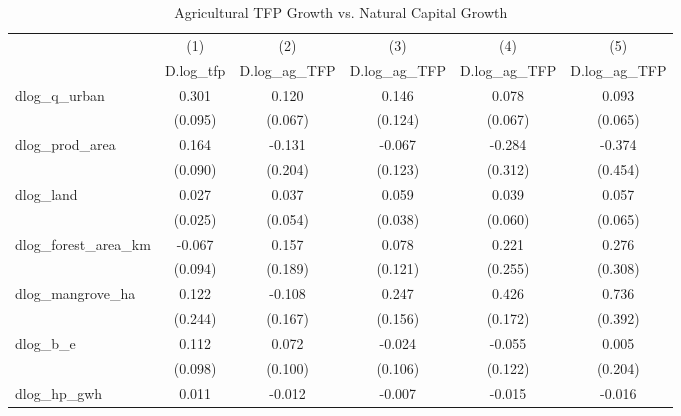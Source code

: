 \begin{table}[htbp]\centering
\def\sym#1{\ifmmode^{#1}\else\(^{#1}\)\fi}
\caption{Agricultural TFP Growth vs. Natural Capital Growth}
\begin{tabular}{l*{5}{c}}
\hline\hline
            &\multicolumn{1}{c}{(1)}&\multicolumn{1}{c}{(2)}&\multicolumn{1}{c}{(3)}&\multicolumn{1}{c}{(4)}&\multicolumn{1}{c}{(5)}\\
            &\multicolumn{1}{c}{D.log\_tfp}&\multicolumn{1}{c}{D.log\_ag\_TFP}&\multicolumn{1}{c}{D.log\_ag\_TFP}&\multicolumn{1}{c}{D.log\_ag\_TFP}&\multicolumn{1}{c}{D.log\_ag\_TFP}\\
\hline
dlog\_q\_urban&       0.301       &       0.120       &       0.146       &       0.078       &       0.093       \\
            &     (0.095)       &     (0.067)       &     (0.124)       &     (0.067)       &     (0.065)       \\
[1em]
dlog\_prod\_area&       0.164       &      -0.131       &      -0.067       &      -0.284       &      -0.374       \\
            &     (0.090)       &     (0.204)       &     (0.123)       &     (0.312)       &     (0.454)       \\
[1em]
dlog\_land   &       0.027       &       0.037       &       0.059       &       0.039       &       0.057       \\
            &     (0.025)       &     (0.054)       &     (0.038)       &     (0.060)       &     (0.065)       \\
[1em]
dlog\_forest\_area\_km&      -0.067       &       0.157       &       0.078       &       0.221       &       0.276       \\
            &     (0.094)       &     (0.189)       &     (0.121)       &     (0.255)       &     (0.308)       \\
[1em]
dlog\_mangrove\_ha&       0.122       &      -0.108       &       0.247       &       0.426       &       0.736       \\
            &     (0.244)       &     (0.167)       &     (0.156)       &     (0.172)       &     (0.392)       \\
[1em]
dlog\_b\_e    &       0.112       &       0.072       &      -0.024       &      -0.055       &       0.005       \\
            &     (0.098)       &     (0.100)       &     (0.106)       &     (0.122)       &     (0.204)       \\
[1em]
dlog\_hp\_gwh &       0.011       &      -0.012       &      -0.007       &      -0.015       &      -0.016       \\

\end{tabular}
\end{table}
